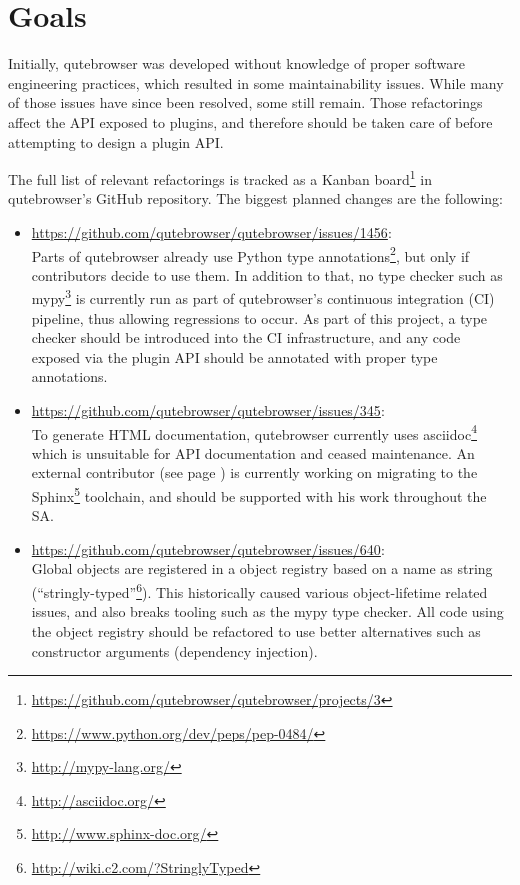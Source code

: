 \documentclass[a4paper,parskip=full]{scrreprt}
\begin{document}
\section{Goals}
\label{goals}

Initially, qutebrowser was developed without knowledge of proper software
engineering practices, which resulted in some maintainability issues. While many
of those issues have since been resolved, some still remain. Those
refactorings affect the API exposed to plugins, and therefore should be taken
care of before attempting to design a plugin API.

The full list of relevant refactorings is tracked as a Kanban
board\footnote{\url{https://github.com/qutebrowser/qutebrowser/projects/3}} in
qutebrowser's GitHub repository. The biggest planned changes are the following:

\begin{itemize}
  \item \url{https://github.com/qutebrowser/qutebrowser/issues/1456}: \\ Parts of qutebrowser already use Python type
    annotations\footnote{\url{https://www.python.org/dev/peps/pep-0484/}}, but
    only if contributors decide to use them. In addition to that, no type
    checker such as mypy\footnote{\url{http://mypy-lang.org/}} is currently run
    as part of qutebrowser's continuous integration (CI) pipeline, thus allowing
    regressions to occur. As part of this project, a type checker should be
    introduced into the CI infrastructure, and any code exposed via the plugin
    API should be annotated with proper type annotations.
  \item \url{https://github.com/qutebrowser/qutebrowser/issues/345}: \\
    To generate HTML documentation, qutebrowser currently uses
    asciidoc\footnote{\url{http://asciidoc.org/}} which is unsuitable for API
    documentation and ceased maintenance. An external contributor (see page
    \pageref{fiete}) is currently working on migrating to the
    Sphinx\footnote{\url{http://www.sphinx-doc.org/}} toolchain, and should be
    supported with his work throughout the SA.
  \item \url{https://github.com/qutebrowser/qutebrowser/issues/640}: \\
    Global objects are registered in a object registry based on a name as
    string (``stringly-typed''\footnote{\url{http://wiki.c2.com/?StringlyTyped}}).
    This historically caused various object-lifetime related issues, and also
breaks tooling such as the mypy type checker. All code using the object registry
should be refactored to use better alternatives such as constructor arguments
(dependency injection).
\end{itemize}
\end{document}
